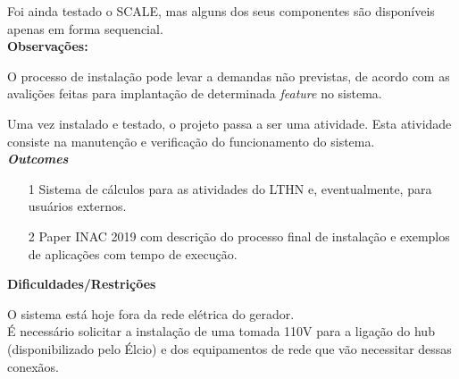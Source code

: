 Foi ainda testado o SCALE, mas alguns dos seus componentes são disponíveis apenas 
em forma sequencial.\\

\textbf{Observações:}

O processo de instalação pode levar a demandas não previstas, de acordo com as avalições feitas para implantação de determinada \textit{feature} no sistema.

Uma vez instalado e testado, o projeto passa a ser uma atividade. Esta atividade 
consiste na manutenção e verificação do funcionamento do sistema.\\

\textbf{\textit{Outcomes}}

\begin{itemize}
	\item[1] Sistema de cálculos para as atividades do LTHN e, eventualmente, para usuários externos.
	\item[2] Paper INAC 2019 com descrição do processo final de instalação e exemplos de aplicações com tempo de execução.

\end{itemize}


\textbf{Dificuldades/Restrições}

O sistema está hoje fora da rede elétrica do gerador.\\



É necessário solicitar a instalação de uma tomada 110V para a ligação do hub 
(disponibilizado pelo Élcio) e dos equipamentos de rede que vão necessitar 
dessas conexãos.\\


